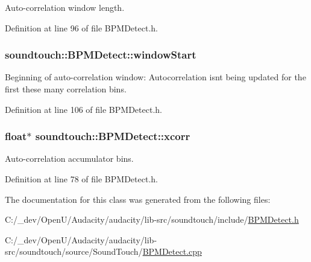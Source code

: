 Auto-\/correlation window length. 



Definition at line 96 of file B\+P\+M\+Detect.\+h.

\subsubsection[{\texorpdfstring{window\+Start}{windowStart}}]{ soundtouch\+::\+B\+P\+M\+Detect\+::window\+Start\hspace{0.3cm}{\ttfamily [protected]}}\hypertarget{classsoundtouch_1_1_b_p_m_detect_a3bd374e10ddade57c3f7a90b143ec30e}{}\label{classsoundtouch_1_1_b_p_m_detect_a3bd374e10ddade57c3f7a90b143ec30e}
Beginning of auto-\/correlation window\+: Autocorrelation isn\textquotesingle{}t being updated for the first these many correlation bins. 

Definition at line 106 of file B\+P\+M\+Detect.\+h.

\subsubsection[{\texorpdfstring{xcorr}{xcorr}}]{\setlength{\rightskip}{0pt plus 5cm}float$\ast$ soundtouch\+::\+B\+P\+M\+Detect\+::xcorr\hspace{0.3cm}{\ttfamily [protected]}}\hypertarget{classsoundtouch_1_1_b_p_m_detect_ab18e3bdf3814375eab8c7dffe0e7e857}{}\label{classsoundtouch_1_1_b_p_m_detect_ab18e3bdf3814375eab8c7dffe0e7e857}


Auto-\/correlation accumulator bins. 



Definition at line 78 of file B\+P\+M\+Detect.\+h.



The documentation for this class was generated from the following files\+:\begin{DoxyCompactItemize}
\item 
C\+:/\+\_\+dev/\+Open\+U/\+Audacity/audacity/lib-\/src/soundtouch/include/\hyperlink{_b_p_m_detect_8h}{B\+P\+M\+Detect.\+h}\item 
C\+:/\+\_\+dev/\+Open\+U/\+Audacity/audacity/lib-\/src/soundtouch/source/\+Sound\+Touch/\hyperlink{_b_p_m_detect_8cpp}{B\+P\+M\+Detect.\+cpp}\end{DoxyCompactItemize}
